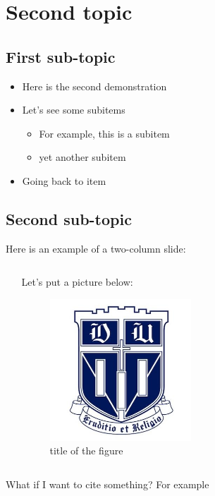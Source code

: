 \section{Second topic}

\sectioncover

\subsection{First sub-topic}

\subsectioncover

\begin{frame}
  \begin{itemize}
    \item Here is the second demonstration
    \item Let's see some subitems
          \begin{itemize}
            \item For example, this is a subitem
            \item yet another subitem
          \end{itemize}
    \item Going back to item
  \end{itemize}
\end{frame}

\subsection{Second sub-topic}

\subsectioncover

\begin{frame}
  Here is an example of a two-column slide:
  \bigskip
  \begin{columns}
    \begin{column}{0.6\textwidth}
      \lipsum[1-1]
    \end{column}
    \begin{column}{0.4\textwidth}
      Let's put a picture below:
      \begin{figure}
        \includegraphics[width=0.5\textwidth]{theme/logos/duke}
        \caption{title of the figure}
      \end{figure}
    \end{column}
  \end{columns}
\end{frame}

\begin{frame}
  What if I want to cite something? For example \cite{oh1951protein}
\end{frame}
